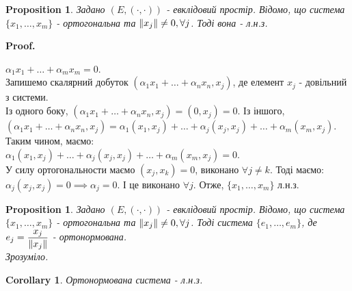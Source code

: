 \documentclass[a4paper, 10pt]{article}
\makeatletter
\theoremstyle{theoremdd}
\newtheorem{proposition}[theorem]{Proposition}
\newtheorem{corollary}[theorem]{Corollary}
\renewenvironment{proof}[1][Proof.\\]{\par
\pushQED{\hfill \qed}%
\normalfont \topsep6\p@\@plus6\p@\relax
\trivlist
\item\relax
{\bfseries
#1\@addpunct{.}}\hspace\labelsep\ignorespaces
}{%
\popQED\endtrivlist\@endpefalse
}
\makeatother
\begin{document}
\begin{proposition}
Задано $(E,(\cdot,\cdot))$ - евклідовий простір. Відомо, що система $\{x_1,\dots,x_m\}$ - ортогональна та $\norm{x_j} \neq 0, \forall j$. Тоді вона - л.н.з.
\end{proposition}

\begin{proof}
$\alpha_1 x_1 + \dots + \alpha_m x_m = 0$.\\
Запишемо скалярний добуток $(\alpha_1 x_1 + \dots + \alpha_n x_n, x_j)$, де елемент $x_j$ - довільний з системи.\\
Із одного боку, $(\alpha_1 x_1 + \dots + \alpha_n x_n, x_j) = (0,x_j) = 0$. Із іншого,\\
$(\alpha_1 x_1 + \dots + \alpha_n x_n, x_j) = \alpha_1 (x_1,x_j) + \dots + \alpha_j (x_j,x_j) + \dots + \alpha_m (x_m,x_j)$.\\
Таким чином, маємо:\\
$\alpha_1 (x_1,x_j) + \dots + \alpha_j (x_j,x_j) + \dots + \alpha_m (x_m,x_j) = 0$.\\
У силу ортогональности маємо $(x_j,x_k) = 0$, виконано $\forall j \neq k$. Тоді маємо:\\
$\alpha_j (x_j,x_j) = 0 \implies \alpha_j = 0$.
І це виконано $\forall j$. Отже, $\{x_1,\dots,x_m\}$ л.н.з.
\end{proof}

\begin{proposition}
\label{orthogonal_to_orthonormal}
Задано $(E,(\cdot,\cdot))$ - евклідовий простір. Відомо, що система $\{x_1,\dots,x_m\}$ - ортогональна та $\norm{x_j} \neq 0, \forall j$. Тоді система $\{e_1,\dots,e_m\}$, де $e_j = \dfrac{x_j}{\norm{x_j}}$ - ортонормована.\\
\textit{Зрозуміло.}
\end{proposition}

\begin{corollary}
Ортонормована система - л.н.з.
\end{corollary}
\end{document}
